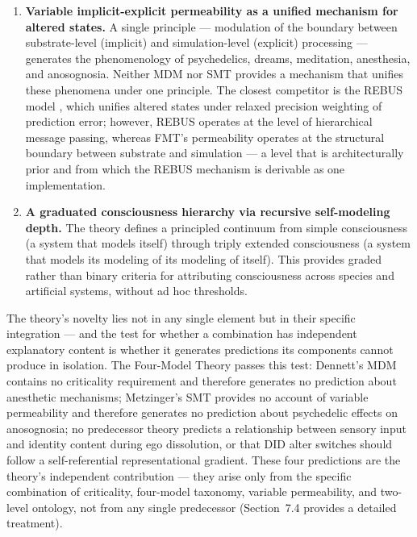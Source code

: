 \documentclass[12pt]{article}
\newcommand{\revstart}{}
\newcommand{\revend}{}
\begin{document}
\begin{enumerate}
\item \textbf{Variable implicit-explicit permeability as a unified mechanism for altered states.} A single principle --- modulation of the boundary between substrate-level (implicit) and simulation-level (explicit) processing --- generates the phenomenology of psychedelics, dreams, meditation, anesthesia, and anosognosia. Neither MDM nor SMT provides a mechanism that unifies these phenomena under one principle. The closest competitor is the REBUS model \citep{CarhartHarris2019}, which unifies altered states under relaxed precision weighting of prediction error; however, REBUS operates at the level of hierarchical message passing, whereas FMT's permeability operates at the structural boundary between substrate and simulation --- a level that is architecturally prior and from which the REBUS mechanism is derivable as one implementation.
\item \textbf{A graduated consciousness hierarchy via recursive self-modeling depth.} The theory defines a principled continuum from simple consciousness (a system that models itself) through triply extended consciousness (a system that models its modeling of its modeling of itself). This provides graded rather than binary criteria for attributing consciousness across species and artificial systems, without ad hoc thresholds.
\end{enumerate}

{\revstart The theory's novelty lies not in any single element but in their specific integration --- and the test for whether a combination has independent explanatory content is whether it generates predictions its components cannot produce in isolation. The Four-Model Theory passes this test: Dennett's MDM contains no criticality requirement and therefore generates no prediction about anesthetic mechanisms; Metzinger's SMT provides no account of variable permeability and therefore generates no prediction about psychedelic effects on anosognosia; no predecessor theory predicts a relationship between sensory input and identity content during ego dissolution, or that DID alter switches should follow a self-referential representational gradient. These four predictions are the theory's independent contribution --- they arise only from the specific combination of criticality, four-model taxonomy, variable permeability, and two-level ontology, not from any single predecessor (Section~7.4 provides a detailed treatment).\revend}
\end{document}
